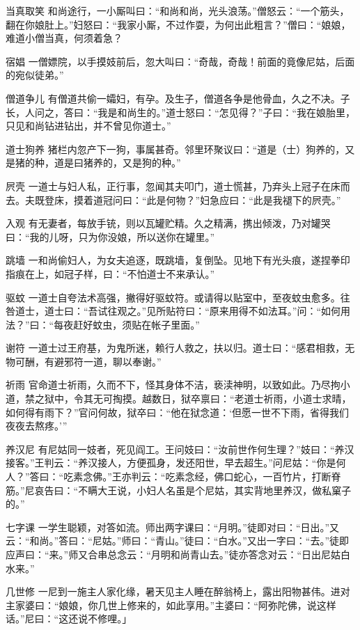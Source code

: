 \documentclass[12pt,UTF8]{ctexbook}
\begin{document}
当真取笑
和尚途行，一小厮叫曰：“和尚和尚，光头浪荡。”僧怒云：“一个筋头，翻在你娘肚上。”妇怒曰：“我家小厮，不过作耍，为何出此粗言？”僧曰：“娘娘，难道小僧当真，何须着急？

宿娼
一僧嫖院，以手摸妓前后，忽大叫曰：“奇哉，奇哉！前面的竟像尼姑，后面的宛似徒弟。”

僧道争儿
有僧道共偷一孀妇，有孕。及生子，僧道各争是他骨血，久之不决。子长，人问之，答曰：“我是和尚生的。”道士怒曰：“怎见得？”子曰：“我在娘胎里，只见和尚钻进钻出，并不曾见你道士。”

道士狗养
猪栏内忽产下一狗，事属甚奇。邻里环聚议曰：“道是（士）狗养的，又是猪的种，道是曰猪养的，又是狗的种。”

屄壳
一道士与妇人私，正行事，忽闻其夫叩门，道士慌甚，乃弃头上冠子在床而去。夫既登床，摸着道冠问曰：“此是何物？”妇急应曰：“此是我褪下的屄壳。”

入观
有无妻者，每放手铳，则以瓦罐贮精。久之精满，携出倾泼，乃对罐哭曰：“我的儿呀，只为你没娘，所以送你在罐里。”

跳墙
一和尚偷妇人，为女夫追逐，既跳墙，复倒坠。见地下有光头痕，遂捏拳印指痕在上，如冠子样，曰：“不怕道士不来承认。”

驱蚊
一道士自夸法术高强，撇得好驱蚊符。或请得以贴室中，至夜蚊虫愈多。往咎道士，道士曰：“吾试往观之。”见所贴符曰：“原来用得不如法耳。”问：“如何用法？”曰：“每夜赶好蚊虫，须贴在帐子里面。”

谢符
一道士过王府基，为鬼所迷，赖行人救之，扶以归。道士曰：“感君相救，无物可酬，有避邪符一道，聊以奉谢。”

祈雨
官命道士祈雨，久而不下，怪其身体不洁，亵渎神明，以致如此。乃尽拘小道，禁之狱中，令其无可掏摸。越数日，狱卒禀曰：“老道士祈雨，小道士求晴，如何得有雨下？”官问何故，狱卒曰：“他在狱念道：‘但愿一世不下雨，省得我们夜夜去熬疼。’”

养汉尼
有尼姑同一妓者，死见阎工。王问妓曰：“汝前世作何生理？”妓曰：“养汉接客。”王判云：“养汉接人，方便孤身，发还阳世，早去超生。”问尼姑：“你是何人？”答曰：“吃素念佛。”王亦判云：“吃素念经，佛口蛇心，一百竹片，打断脊筋。”尼哀告曰：“不瞒大王说，小妇人名虽是个尼姑，其实背地里养汉，做私窠子的。”

七字课
一学生聪颖，对答如流。师出两字课曰：“月明。”徒即对曰：“日出。”又云：“和尚。”答曰：“尼姑。”师曰：“青山。”徒曰：“白水。”又出一字曰：“去。”徒即应声曰：“来。”师又合串总念云：“月明和尚青山去。”徒亦答念对云：“日出尼姑白水来。”

几世修
一尼到一施主人家化缘，暑天见主人睡在醉翁椅上，露出阳物甚伟。进对主家婆曰：“娘娘，你几世上修来的，如此享用。”主婆曰：“阿弥陀佛，说这样话。”尼曰：“这还说不修哩。」
\end{document}
